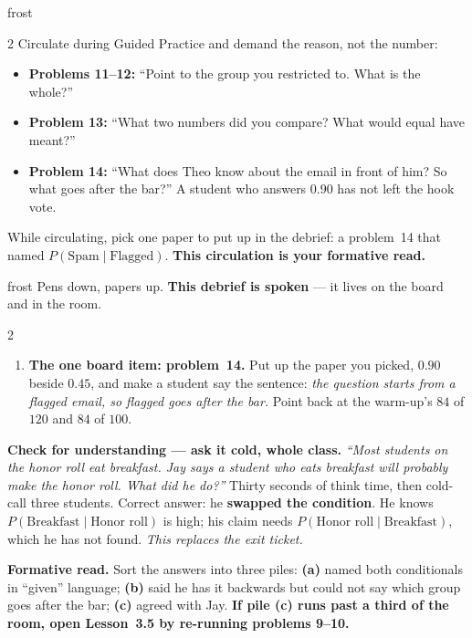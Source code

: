 \documentclass[10pt]{article}
\begin{document}
\begin{skillbox}{frost}
\begin{multicols}{2}
Circulate during Guided Practice and demand the reason, not the number:
\begin{itemize}[leftmargin=1.1em, nosep]
  \item \textbf{Problems 11--12:} ``Point to the group you restricted to. What is the whole?''
  \item \textbf{Problem 13:} ``What two numbers did you compare? What would equal have meant?''
  \item \textbf{Problem 14:} ``What does Theo know about the email in front of him? So what goes
        after the bar?'' A student who answers $0.90$ has not left the hook vote.
\end{itemize}
While circulating, pick one paper to put up in the debrief: a problem~14 that named
$P(\text{Spam} \mid \text{Flagged})$. \textbf{This circulation is your formative read.}
\end{multicols}
\end{skillbox}

\boxguard[24]
\begin{skillbox}{frost}
Pens down, papers up. \textbf{This debrief is spoken} --- it lives on the board and in the room.
\begin{multicols}{2}
\begin{enumerate}[leftmargin=1.3em, nosep, itemsep=3pt]
  \item \textbf{The one board item: problem~14.} Put up the paper you picked, $0.90$ beside $0.45$,
        and make a student say the sentence: \emph{the question starts from a flagged email, so
        flagged goes after the bar.} Point back at the warm-up's $84$ of $120$ and $84$ of $100$.
\end{enumerate}
\columnbreak
\textbf{Check for understanding --- ask it cold, whole class.} \emph{``Most students on the honor
roll eat breakfast. Jay says a student who eats breakfast will probably make the honor roll. What
did he do?''} Thirty seconds of think time, then cold-call three students. Correct answer: he
\textbf{swapped the condition}. He knows $P(\text{Breakfast} \mid \text{Honor roll})$ is high; his
claim needs $P(\text{Honor roll} \mid \text{Breakfast})$, which he has not found. \emph{This replaces
the exit ticket.}

\textbf{Formative read.} Sort the answers into three piles: \textbf{(a)} named both conditionals in
``given'' language; \textbf{(b)} said he has it backwards but could not say which group goes after
the bar; \textbf{(c)} agreed with Jay. \textbf{If pile (c) runs past a third of the room, open
Lesson~3.5 by re-running problems 9--10.}
\end{multicols}
\end{skillbox}
\end{document}
